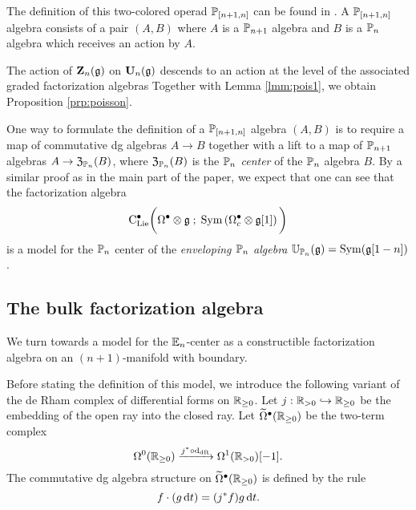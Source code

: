\documentclass[11pt]{amsart}
\numberwithin{equation}{section}
\begin{document}
The definition of this two-colored operad $\mathbb P_{[n+1,n]}$ can be found in \cite{SafronovCoiso}. 
A $\mathbb P_{[n+1,n]}$ algebra consists of a pair $(A,B)$ where $A$ is a $\mathbb P_{n+1}$ algebra and $B$ is a $\mathbb P_n$ algebra which receives an action by $A$. 

The action of $\mathbf Z_n(\mathfrak g)$ on $\mathbf U_n(\mathfrak g)$ descends to an action at the level of the associated graded factorization algebras
Together with Lemma \ref{lmm:pois1}, we obtain Proposition \ref{prp:poisson}. 

\begin{rmk}
One way to formulate the definition of a $\mathbb P_{[n+1,n]}$ algebra $(A,B)$ is to require a map of commutative dg algebras $A \to B$ together with a lift to a map of $\mathbb P_{n+1}$ algebras $A \to \mathfrak Z_{\mathbb P_n} (B)$, where $\mathfrak Z_{\mathbb P_n}(B)$ is the {\em $\mathbb P_n$ center} of the $\mathbb P_n$ algebra $B$. 
By a similar proof as in the main part of the paper, we expect that one can see that the factorization algebra
\[
{\rm C}_{\rm Lie}^\bullet \bigg(\Omega^\bullet \otimes \mathfrak g \; ; \; {\rm Sym} \left(\Omega^\bullet_c \otimes \mathfrak g [1] \right) \bigg)
\]
is a model for the $\mathbb P_n$ center of the {\em enveloping $\mathbb P_n$ algebra} $\mathbb U_{\mathbb P_n} (\mathfrak g) = {\rm Sym} (\mathfrak g [1-n])$. 
\end{rmk}

\subsection{The bulk factorization algebra} \label{sec:bulk}

We turn towards a model for the $\mathbb E_n$-center as a constructible factorization algebra on an $(n+1)$-manifold with boundary.

Before stating the definition of this model, we introduce the following variant of the de Rham complex of differential forms on $\mathbb R_{\geq 0}$. 
Let $j : \mathbb R_{>0} \hookrightarrow \mathbb R_{\geq 0}$ be the embedding of the open ray into the closed ray. 
Let $\widetilde{\Omega}^\bullet (\mathbb R_{\geq 0})$ be the two-term complex
\[
\Omega^0(\mathbb R_{\geq 0}) \xrightarrow{j^* \circ {\rm d}_{\rm dR}} \Omega^1(\mathbb R_{>0})[-1]  .
\]
The commutative dg algebra structure on $\widetilde{\Omega}^\bullet (\mathbb R_{\geq 0})$ is defined by the rule
\[
f \cdot (g \, {\rm d} t) = (j^* f) g\, {\rm d} t .
\]
\end{document}
